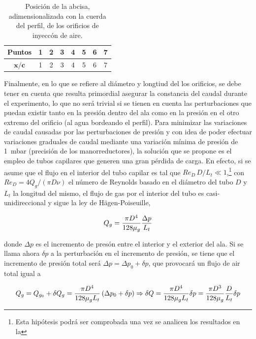 \begin{table}
\centering
\begin{tabular}{c || c c c c c c c}
\textbf{Puntos} &1&2&3&4&5&6&7 \\
\hline \hline
$\mathbf{x/c}$ & 1 &2 &3 &4 &5 &6 &7 \\
\end{tabular}
\caption{Posición de la abcisa, adimensionalizada con la cuerda del perfil, de los orificios de inyeccón de aire.}
\end{table}

Finalmente, en lo que se refiere al diámetro y longtiud del los orificios, se debe tener en cuenta que resulta primordial asegurar la constancia del caudal durante el experimento, lo que no será trivial si se tienen en cuenta las perturbaciones que puedan existir tanto en la presión dentro del ala como en la presión en el otro extremo del orificio (al agua bordeando el perfil). Para minimizar las variaciones de caudal causadas por las perturbaciones de presión y con idea de poder efectuar variaciones graduales de caudal mediante una variación mínima de presión de 1~mbar (precisión de los manorreductores), la solución que se propone es el empleo de tubos capilares que generen una gran pérdida de carga. En efecto, si se asume que el flujo en el interior del tubo capilar es tal que $Re_{D}\,D/L_{t} \ll 1$,\footnote{Esta hipótesis podrá ser comprobada una vez se analicen los resultados en la } con $Re_{D} =  4Q_{g}/\left(\pi D \nu \right)$ el número de Reynolds basado en el diámetro del tubo $D$ y $L_{t}$ la longitud del mismo, el flujo de gas por el interior del tubo es casi-unidireccional y sigue la ley de Hägen-Poiseuille,

\begin{equation}
Q_{g} = \dfrac{\pi D^{4}}{128 \mu_{g}}\dfrac{\Delta p}{L_{t}}
\LABEQ{poiseuille}
\end{equation}

donde $\Delta p$ es el incremento de presón entre el interior y el exterior del ala. Si se llama ahora $\delta p$ a la perturbación en el incremento de presión, se tiene que el incremento de presión total será $\Delta p = \Delta p_{0} + \delta p$, que provocará un flujo de air total igual a 

\begin{equation}
Q_{g} = Q_{g_{0}} + \delta Q_{g} = \dfrac{\pi D^{4}}{128 \mu_{g} L_{t}}\left(\Delta p_{0} +  \delta p\right) \Rightarrow \delta Q = \dfrac{\pi D^{4}}{128 \mu_{g} L_{t}}\delta p = \dfrac{\pi D^{3}}{128\mu_{g}}\dfrac{D}{L_{t}}\delta p
\LABEQ{perdidaCarga}
\end{equation}

